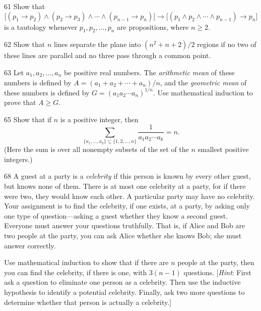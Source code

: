 \documentclass[11pt]{article}
\begin{document}
\begin{exercise}{61}
    Show that
    \[
    \big[(p_1 \to p_2) \wedge (p_2 \to p_3) \wedge \cdots \wedge
    (p_{n-1} \to p_n)\big]
    \to \big[(p_1 \wedge p_2 \wedge \cdots \wedge p_{n-1}) \to p_n\big]
    \]
    is a tautology whenever $p_1, p_2, \dots, p_n$ are propositions,
    where $n \geq 2$.
\end{exercise}

\begin{exercise}{62}
    Show that $n$ lines separate the plane into $(n^2+n+2)/2$ regions
    if no two of these lines are parallel and no three pass through a
    common point.
\end{exercise}

\begin{exercise}{63}
    Let $a_1, a_2, \dots, a_n$ be positive real numbers. The
    \emph{arithmetic mean} of these numbers is defined by
    $A = (a_1 + a_2 + \cdots + a_n)/n$, and the \emph{geometric mean}
    of these numbers is defined by $G = (a_1 a_2 \cdots a_n)^{1/n}$.
    Use mathematical induction to prove that $A \geq G$.
\end{exercise}

\begin{exercise}{65}
    Show that if $n$ is a positive integer, then
    \[
    \sum_{\{a_1, \dots, a_k\} \subseteq \{1, 2, \dots, n\}}
    \frac{1}{a_1 a_2 \cdots a_k} = n.
    \]
    (Here the sum is over all nonempty subsets of the set of the $n$
    smallest positive integers.)
\end{exercise}

\begin{exercise}{68}
    A guest at a party is a \emph{celebrity} if this person is known
    by every other guest, but knows none of them. There is at most
    one celebrity at a party, for if there were two, they would know
    each other. A particular party may have no celebrity. Your
    assignment is to find the celebrity, if one exists, at a party, by
    asking only one type of question---asking a guest whether they
    know a second guest. Everyone must answer your questions
    truthfully. That is, if Alice and Bob are two people at the
    party, you can ask Alice whether she knows Bob; she must answer
    correctly.

    Use mathematical induction to show that if there are $n$ people at
    the party, then you can find the celebrity, if there is one, with
    $3(n-1)$ questions.
    [\emph{Hint}: First ask a question to eliminate one person as a
    celebrity. Then use the inductive hypothesis to identify a
    potential celebrity. Finally, ask two more questions to determine
    whether that person is actually a celebrity.]
\end{exercise}
\end{document}
